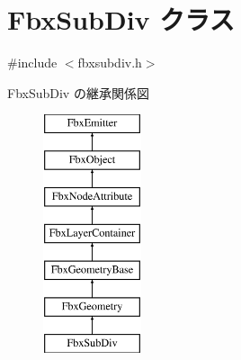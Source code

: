 \hypertarget{class_fbx_sub_div}{}\section{Fbx\+Sub\+Div クラス}
\label{class_fbx_sub_div}


{\ttfamily \#include $<$fbxsubdiv.\+h$>$}

Fbx\+Sub\+Div の継承関係図\begin{figure}[H]
\begin{center}
\leavevmode
\includegraphics[height=7.000000cm]{class_fbx_sub_div}
\end{center}
\end{figure}
